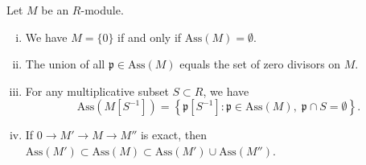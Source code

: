 \begin{theorem}\label{prop:Ass-properties}
	Let $M$ be an $R$-module.
	\begin{enumerate}[(i)]
		\item We have $M = \{0\}$ if and only if $\text{Ass}(M) = \emptyset$.
		\item The union of all $\mathfrak{p} \in \text{Ass}(M)$ equals the set of zero divisors on $M$.
		\item For any multiplicative subset $S \subset R$, we have
			\[ \text{Ass}(M[S^{-1}]) = \left\{ \mathfrak{p}[S^{-1}] : \mathfrak{p} \in \text{Ass}(M), \; \mathfrak{p} \cap S = \emptyset \right\} . \]
		\item If $0 \to M' \to M \to M''$ is exact, then $\text{Ass}(M') \subset \text{Ass}(M) \subset \text{Ass}(M') \cup \text{Ass}(M'')$.
	\end{enumerate}
\end{theorem}
